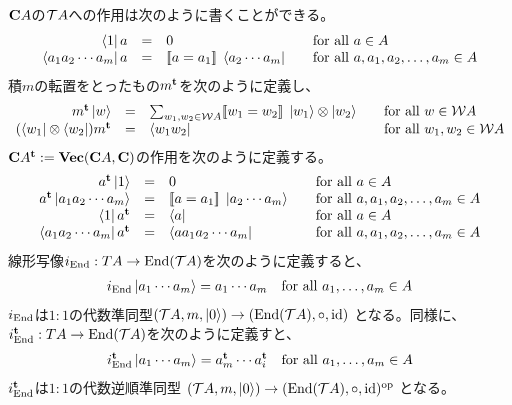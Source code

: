 	$\mathbf{C} A$の${{\mathcal{T}}} A$への作用は次のように書くことができる。
	{\setlength\arraycolsep{2pt}
	\begin{equation*}\begin{array}{rcll}
		\mathinner{\langle{1}|}a &=& 0  &\quad\text{for all }a\in A \\
		\mathinner{\langle{a_1a_2\cdots a_m}|}a &=& [\![a=a_1]\!]\;\mathinner{\langle{a_2\cdots a_m}|}
		&\quad\text{for all }a,a_1,a_2,\dots,a_m\in A
	\end{array}\end{equation*}
	}
	積$m$の転置をとったもの$m^{\mathbf{t}}$を次のように定義し、
	{\setlength\arraycolsep{2pt}
	\begin{equation*}\begin{array}{rcll}
		m^{\mathbf{t}}\mathinner{|{w}\rangle} &=& \sum_{w_1,w_2\in{\ensuremath{{\mathcal{W}}}} A}[\![w_1 = w_2]\!]\;
			\mathinner{|{w_1}\rangle}\otimes \mathinner{|{w_2}\rangle} & \quad\text{for all }w\in {\ensuremath{{\mathcal{W}}}} A \\
		(\mathinner{\langle{w_1}|}\otimes\mathinner{\langle{w_2}|})m^{\mathbf{t}} &=& \mathinner{\langle{w_1w_2}|}
			& \quad\text{for all }w_1,w_2\in {\ensuremath{{\mathcal{W}}}} A \\
	\end{array}\end{equation*}
	}
	$\mathbf{C} A^{\mathbf{t}}:={\mathbf{Vec}}(\mathbf{C} A,\mathbf{C})$の作用を次のように定義する。
	{\setlength\arraycolsep{2pt}
	\begin{equation*}\begin{array}{rcll}
		a^{\mathbf{t}}\mathinner{|{1}\rangle} &=& 0  &\quad\text{for all }a\in A \\
		a^{\mathbf{t}}\mathinner{|{a_1a_2\cdots a_m}\rangle} &=& [\![a=a_1]\!]\;\mathinner{|{a_2\cdots a_m}\rangle}
		&\quad\text{for all }a,a_1,a_2,\dots,a_m\in A \\
		\mathinner{\langle{1}|}a^{\mathbf{t}} &=& \mathinner{\langle{a}|}  &\quad\text{for all }a\in A \\
		\mathinner{\langle{a_1a_2\cdots a_m}|}a^{\mathbf{t}} &=& \mathinner{\langle{aa_1a_2\cdots a_m}|}
		&\quad\text{for all }a,a_1,a_2,\dots,a_m\in A
	\end{array}\end{equation*}
	}
	線形写像$i_{\operatorname{End}}:T A\to{\ensuremath{\operatorname{End}}}({{\mathcal{T}}} A)$を次のように定義すると、
	\begin{equation*}\begin{split}
		i_{\operatorname{End}}\mathinner{|{a_1\cdots a_m}\rangle} = a_1\cdots a_m
		\quad\text{for all }a_1,\dots,a_m\in A
	\end{split}\end{equation*}
	$i_{\operatorname{End}}$は$1:1$の代数準同型$({{\mathcal{T}}} A,m,\mathinner{|{0}\rangle})\to({\operatorname{End}}({{\mathcal{T}}} A),\circ,{\operatorname{id}})$
	となる。同様に、$i_{\operatorname{End}}^{\mathbf{t}}:T A\to{\ensuremath{\operatorname{End}}}({{\mathcal{T}}} A)$を次のように定義すと、
	\begin{equation*}\begin{split}
		i_{\operatorname{End}}^{\mathbf{t}}\mathinner{|{a_1\cdots a_m}\rangle} = a_m^{\mathbf{t}}\cdots a_i^{\mathbf{t}}
		\quad\text{for all }a_1,\dots,a_m\in A
	\end{split}\end{equation*}
	$i_{\operatorname{End}}^{\mathbf{t}}$は$1:1$の代数逆順準同型
	$({{\mathcal{T}}} A,m,\mathinner{|{0}\rangle})\to({\operatorname{End}}({{\mathcal{T}}} A),\circ,{\operatorname{id}})^{{\operatorname{op}}}$
	となる。

